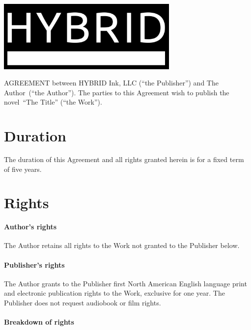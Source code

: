 \documentclass[12pt,letterpaper]{article}
\def\WorkTitle{The Title}
\def\WorkAuthor{The Author}
\def\WorkType{novel}
\begin{document}
\begin{center}
\noindent\includegraphics[width=3.5in]{logo}
\end{center}

\vspace{0.5in}

\noindent AGREEMENT between HYBRID Ink, LLC (``the Publisher'') and \WorkAuthor\ (``the Author''). The parties to this Agreement wish to publish the \WorkType\ ``\WorkTitle'' (``the Work'').

\section{Duration}

The duration of this Agreement and all rights granted herein is for a fixed term of five years.

\section{Rights}

\paragraph{Author's rights}

The Author retains all rights to the Work not granted to the Publisher below.

\paragraph{Publisher's rights}

The Author grants to the Publisher first North American English language print and electronic publication rights to the Work, exclusive for one year. The Publisher does not request audiobook or film rights.

\paragraph{Breakdown of rights}
\end{document}
